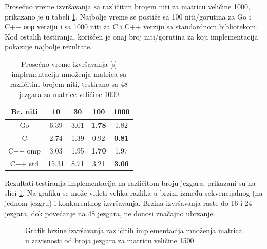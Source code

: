 \documentclass[12pt,oneside]{memoir}
\begin{document}
Prosečno vreme izvršavanja sa različitim brojem niti za matricu veličine 1000, prikazano je u tabeli \ref{tab:matrix5}. Najbolje vreme se postiže sa 100 niti/gorutina za Go i C++ \texttt{omp} verziju i sa 1000 niti za C i C++ verziju sa standardnom bibliotekom. Kod ostalih testiranja, korišćen je onaj broj niti/gorutina za koji implementacija pokazuje najbolje rezultate. 
\\

\begin{table}
\begin{center}
\caption{Prosečno vreme izvršavanja [s] implementacija množenja matrica sa različitim brojem niti, testirano sa 48 jezgara za matrice veličine 1000}
\begin{tabular}{||c||c c c c||}
\hline
Br. niti		&10&30 &100 &1000\\ \hline
Go		&6.39	&3.01&\textbf{1.78}&1.82	 \\ \hline
C		&2.74	&1.39&0.92&\textbf{0.81} \\ \hline
C++ omp	&3.03	&1.95&\textbf{1.70}&1.97 \\ \hline
C++ std	&15.31&8.71&3.21&\textbf{3.06} \\ \hline
\end{tabular}
\label{tab:matrix5}
\end{center}
\end{table}

Rezultati testiranja implementacija na različitom broju jezgara, prikazani su na slici \ref{fig:matrix3}. Na grafiku se može videti velika razlika u brzini između sekvencijalnog (na jednom jezgru) i konkurentnog izvršavanja. Brzina izvršavanja raste do 16 i 24 jezgara, dok povećanje na 48 jezgara, ne donosi značajno ubrzanje. 
\\

\begin{figure}
\begin{center}


\caption{Grafik brzine izvršavanja različitih implementacija množenja matrica u zavisnosti od broja jezgara za matricu veličine 1500}
\label{fig:matrix3}
\end{center}
\end{figure}
\end{document}
